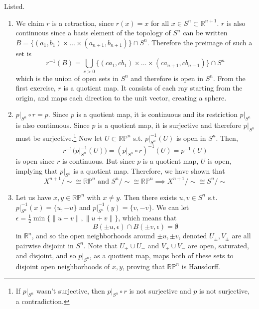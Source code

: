  \begin{solution}
    Listed. 
    \begin{enumerate}
      \item We claim $r$ is a retraction, since $r(x) = x$ for all $x \in S^n \subset \mathbb{R}^{n+1}$. $r$ is also continuous since a basis element of the topology of $S^n$ can be written $B = \big\{(a_1, b_1) \times \ldots \times (a_{n+1}, b_{n+1}) \big\} \cap S^n$. Therefore the preimage of such a set is 
      \begin{equation}
        r^{-1} (B) = \bigcup_{c > 0} \big\{(c a_1, c b_1) \times \ldots \times (c a_{n+1}, c b_{n+1}) \big\} \cap S^n 
      \end{equation}
      which is the union of open sets in $S^n$ and therefore is open in $S^n$. From the first exercise, $r$ is a quotient map. It consists of each ray starting from the origin, and maps each direction to the unit vector, creating a sphere.   


      \item $p|_{S^n} \circ r = p$. Since $p$ is a quotient map, it is continuous and its restriction $p|_{S^n}$ is also continuous. Since $p$ is a quotient map, it is surjective and therefore $p|_{S^n}$ must be surjective.\footnote{If $p|_{S^n}$ wasn't surjective, then $p|_{S^n} \circ r$ is not surjective and $p$ is not surjective, a contradiction. } Now let $U \subset \mathbb{RP}^n$ s.t. $p|_{S^n}^{-1} (U)$ is open in $S^n$. Then, 
      \begin{equation}
        r^{-1} \big( p|_{S^n}^{-1} (U) \big) = (p |_{S^n} \circ r)^{-1} (U) = p^{-1} (U)
      \end{equation} 
      is open since $r$ is continuous. But since $p$ is a quotient map, $U$ is open, implying that $p|_{S^n}$ is a quotient map. Therefore, we have shown that 
      \begin{equation}
        X^{n+1} / \sim \cong \mathbb{RP}^n \text{ and } S^n / \sim \cong \mathbb{RP}^n \implies X^{n+1} / \sim \cong S^n / \sim
      \end{equation}

      \item Let us have $x, y \in \mathbb{RP}^n$ with $x \neq y$. Then there exists $u, v \in S^n$ s.t. $p|_{S^n}^{-1}(x) = \{u, -u\}$ and $p|_{S^n}^{-1} (y) = \{v, -v\}$. We can let $\epsilon = \frac{1}{2} \min\{ \|u - v\|, \|u + v\|\}$, which means that 
      \begin{equation}
        B(\pm u, \epsilon) \cap B(\pm v, \epsilon) = \emptyset 
      \end{equation}
      in $\mathbb{R}^n$, and so the open neighborhoods around $\pm u, \pm v$, denoted $U_{\pm}, V_{\pm}$ are all pairwise disjoint in $S^n$. Note that $U_+ \cup U_-$ and $V_+ \cup V_-$ are open, saturated, and disjoint, and so $p|_{S^n}$, as a quotient map, maps both of these sets to disjoint open neighborhoods of $x, y$, proving that $\mathbb{RP}^n$ is Hausdorff. 


\end{enumerate}
\end{solution}

